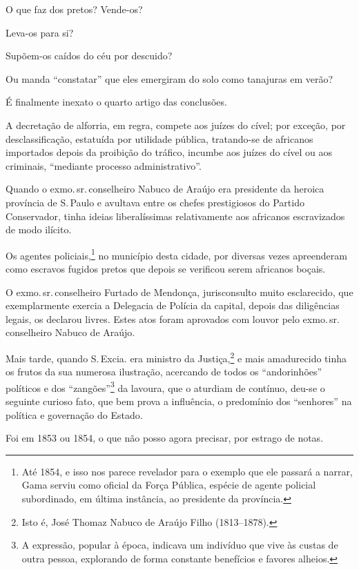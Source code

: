 O que faz dos pretos? Vende-os?

Leva-os para si?

Supõem-os caídos do céu por descuido?

Ou manda ``constatar'' que eles emergiram do solo como tanajuras em verão?

É finalmente inexato o quarto artigo das conclusões.

A decretação de alforria, em regra, compete aos juízes do cível; por
exceção, por desclassificação, estatuída por utilidade pública,
tratando-se de africanos importados depois da proibição do tráfico,
incumbe aos juízes do cível ou aos criminais, ``mediante processo
administrativo''.

Quando o exmo.\,sr.\,conselheiro Nabuco de Araújo era presidente da
heroica província de S.\,Paulo e avultava entre os chefes prestigiosos do
Partido Conservador, tinha ideias liberalíssimas relativamente aos
africanos escravizados de modo ilícito.

Os agentes policiais,\footnote{Até 1854, e isso nos parece revelador
  para o exemplo que ele passará a narrar, Gama serviu como oficial da
  Força Pública, espécie de agente policial subordinado, em última
  instância, ao presidente da província.} no município desta cidade,
por diversas vezes apreenderam como escravos fugidos pretos que depois
se verificou serem africanos boçais.

O exmo.\,sr.\,conselheiro Furtado de Mendonça, jurisconsulto muito
esclarecido, que exemplarmente exercia a Delegacia de Polícia da
capital, depois das diligências legais, os declarou livres. Estes atos
foram aprovados com louvor pelo exmo.\,sr.\,conselheiro Nabuco de Araújo.

Mais tarde, quando S.\,Excia. era ministro da Justiça,\footnote{Isto é,
  José Thomaz Nabuco de Araújo Filho (1813--1878).} e mais amadurecido
tinha os frutos da sua numerosa ilustração, acercando de todos os
``andorinhões'' políticos e dos ``zangões''\footnote{A expressão, popular
  à época, indicava um indivíduo que vive às custas de outra pessoa,
  explorando de forma constante benefícios e favores alheios.} da
lavoura, que o aturdiam de contínuo, deu-se o seguinte curioso fato, que
bem prova a influência, o predomínio dos ``senhores'' na política e
governação do Estado.

Foi em 1853 ou 1854, o que não posso agora precisar, por estrago de
notas.


